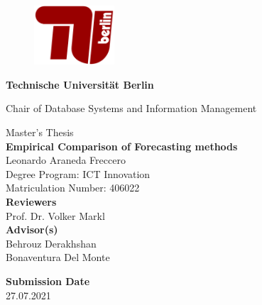 \thispagestyle{empty}
\begin{center}

    \begin{figure}[t]
        \centering
        \includegraphics[width=3cm]{./img/TU-Berlin-Logo.pdf}%
    \end{figure}

    {\LARGE \textbf{Technische Universit\"at Berlin}}

    \vspace{0.5cm}

    {\large Chair of Database Systems and Information Management\\[1.6mm]}


    \vspace{2.0cm}

    {\LARGE Master's Thesis}\\

    \vspace{2.5cm}
    {\LARGE \textbf{Empirical Comparison of Forecasting methods}}\\
    \vspace{1.0cm}
    Leonardo Araneda Freccero \\
    Degree Program: ICT Innovation\\
    Matriculation Number: 406022\\

    \vspace*{2.5cm}
    \textbf{Reviewers}\\
    Prof. Dr. Volker Markl\\
    \vspace*{0.5cm}
    \textbf{Advisor(s)}\\
    Behrouz Derakhshan\\
    Bonaventura Del Monte\\
    \vspace{0.5 cm}

    \textbf{Submission Date}\\
    27.07.2021\\ %
\end{center}

